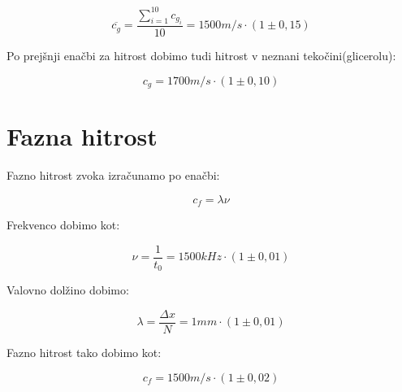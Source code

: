 \documentclass[a4paper]{report}
\begin{document}
\[\overline{c_g}= \frac{\sum_{i = 1}^{10}c_{g_i}}{10} = 1500m/s \cdot(1\pm0,15) \]

\noindent Po prejšnji enačbi za hitrost dobimo tudi hitrost v neznani tekočini(glicerolu):

\[c_g= 1700m/s \cdot(1\pm0,10)\]

\section*{Fazna hitrost}

\noindent Fazno hitrost zvoka izračunamo po enačbi:

\[c_f = \lambda \nu\]

\noindent Frekvenco dobimo kot:

\[\nu=\frac{1}{t_0}=1500kHz \cdot (1\pm 0,01)\]

\noindent Valovno dolžino dobimo:

\[\lambda = \frac{\Delta x}{N}= 1mm \cdot (1\pm 0,01)\]

\noindent Fazno hitrost tako dobimo kot:

\[c_f= 1500m/s \cdot (1\pm 0,02)\]
\end{document}
